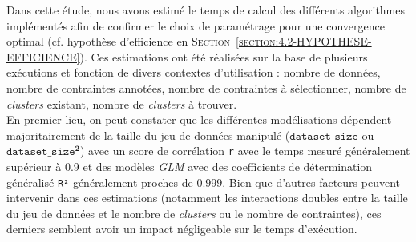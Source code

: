 			Dans cette étude, nous avons estimé le temps de calcul des différents algorithmes implémentés afin de confirmer le choix de paramétrage pour une convergence optimal (cf. hypothèse d'efficience en \textsc{Section~\ref{section:4.2-HYPOTHESE-EFFICIENCE}}).
			Ces estimations ont été réalisées sur la base de plusieurs exécutions et fonction de divers contextes d'utilisation : nombre de données, nombre de contraintes annotées, nombre de contraintes à sélectionner, nombre de \textit{clusters} existant, nombre de \textit{clusters} à trouver.
			\\
			
			En premier lieu, on peut constater que les différentes modélisations dépendent majoritairement de la taille du jeu de données manipulé ($\texttt{dataset\_size}$ ou $\texttt{dataset\_size}^{\textbf{2}}$) avec un score de corrélation \texttt{r} avec le temps mesuré généralement supérieur à $0.9$ et des modèles \textit{GLM} avec des coefficients de détermination généralisé \texttt{R²} généralement proches de $0.999$.
			Bien que d'autres facteurs peuvent intervenir dans ces estimations (notamment les interactions doubles entre la taille du jeu de données et le nombre de \textit{clusters} ou le nombre de contraintes), ces derniers semblent avoir un impact négligeable sur le temps d'exécution.
			
